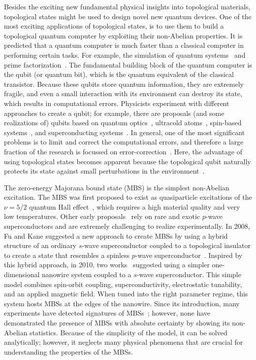 Besides the exciting new fundamental physical insights into topological materials, topological states might be used to design novel new quantum devices.
One of the most exciting applications of topological states, is to use them to build a topological quantum computer by exploiting their non-Abelian properties.
It is predicted that a quantum computer is much faster than a classical computer in performing certain tasks.
For example, the simulation of quantum systems~\cite{Feynman1982} and prime factorization~\cite{Shor1994}.
The fundamental building block of the quantum computer is the qubit (or quantum bit), which is the quantum equivalent of the classical transistor.
Because these qubits store quantum information, they are extremely fragile, and even a small interaction with its environment can destroy its state, which results in computational errors.
Physicists experiment with different approaches to create a qubit; for example, there are proposals (and some realizations of) qubits based on quantum optics~\cite{Kok2007}, ultracold atoms~\cite{Friis2018}, spin-based systems~\cite{Vandersypen2017}, and superconducting systems~\cite{Arute2019}.
In general, one of the most significant problems is to limit and correct the computational errors, and therefore a large fraction of the research is focussed on error-correction~\cite{Lidar2013}.
Here, the advantage of using topological states becomes apparent because the topological qubit naturally protects its state against small perturbations in the environment~\cite{Nayak2008}.

The zero-energy Majorana bound state (MBS) is the simplest non-Abelian excitation.
The MBS was first proposed to exist as quasiparticle excitations of the $\nu = 5/2$ quantum Hall effect~\cite{Read2000,Moore1991}, which requires a high material quality and very low temperatures.
Other early proposals~\cite{Gurarie2005,Sarma2006,Tewari2007} rely on rare and exotic $p$-wave superconductors and are extremely challenging to realize experimentally.
In 2008, Fu and Kane suggested a new approach to create MBSs by using a hybrid structure of an ordinary $s$-wave superconductor coupled to a topological insulator to create a state that resembles a spinless $p$-wave superconductor~\cite{Fu2008}.
Inspired by this hybrid approach, in 2010, two works~\cite{Lutchyn2010,Oreg2010} suggested using a simpler one-dimensional nanowire system coupled to a $s$-wave superconductor.
This simple model combines spin-orbit coupling, superconductivity, electrostatic tunability, and an applied magnetic field.
When tuned into the right parameter regime, this system hosts MBSs at the edges of the nanowire.
Since its introduction, many experiments have detected signatures of MBSs~\cite{Mourik2012,Das2012,Deng2012,Deng2016,Deng2016a,Chen2017a}; however, none have demonstrated the presence of MBSs with absolute certainty by showing its non-Abelian statistics.
Because of the simplicity of the model, it can be solved analytically; however, it neglects many physical phenomena that are crucial for understanding the properties of the MBSs.

